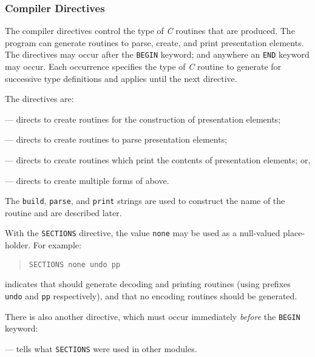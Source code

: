 \subsubsection	{Compiler Directives}
The compiler directives control the type of {\em C\/} routines
that are produced. The  program can generate
routines to parse, create, and print presentation elements.
The directives may occur after the \verb"BEGIN" keyword;
and anywhere an \verb"END" keyword may occur. Each occurrence specifies
the type of {\em C\/} routine to generate for successive
type definitions and applies until the next directive.

\newpage	%
The directives are:
\begin{describe}
\item[\verb"ENCODER" build] --- directs  to create
routines for the construction of presentation elements;

\item[\verb"DECODER" parse] --- directs  to create
routines to parse presentation elements;

\item[\verb"PRINTER" print] --- directs  to create
routines which print the contents of presentation elements;
or,

\item[\verb"SECTIONS" build parse print] --- directs 
to create multiple forms of above.
\end{describe}
The \verb"build", \verb"parse", and \verb"print" strings are used to construct
the name of the routine and are described later.

With the \verb"SECTIONS" directive,
the value \verb"none" may be used as a null-valued place-holder.
For example:
\begin{quote}\small\begin{verbatim}
SECTIONS none undo pp
\end{verbatim}\end{quote}
indicates that  should generate decoding and printing routines
(using prefixes \verb"undo" and \verb"pp" respectively),
and that no encoding routines should be generated.

There is also another directive,
which must occur immediately {\em before\/} the \verb"BEGIN" keyword:
\begin{describe}
\item[\verb"PREFIXES" build parse print] --- tells 
what \verb"SECTIONS" were used in other modules.
\end{describe}

